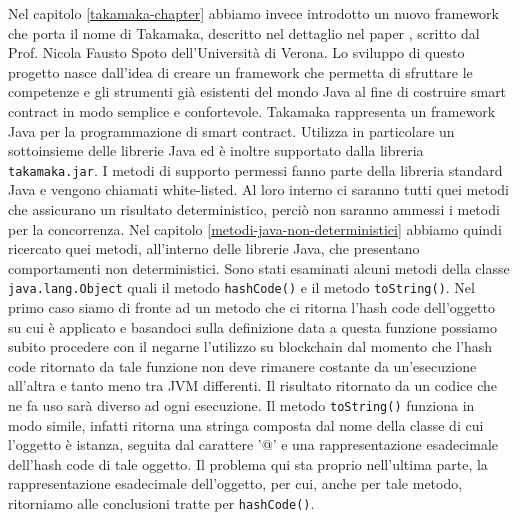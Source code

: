 Nel capitolo \ref{takamaka-chapter} abbiamo invece introdotto un nuovo framework che porta il nome di Takamaka, descritto nel dettaglio nel paper \cite{paper-takamaka:spoto}, scritto dal Prof. Nicola Fausto Spoto dell'Università di Verona. Lo sviluppo di questo progetto nasce dall'idea di creare un framework che permetta di sfruttare le competenze e gli strumenti già esistenti del mondo Java al fine di costruire smart contract in modo semplice e confortevole. Takamaka rappresenta un framework Java per la programmazione di smart contract. Utilizza in particolare un sottoinsieme delle librerie Java ed è inoltre supportato dalla libreria \lstinline|takamaka.jar|. I metodi di supporto permessi fanno parte della libreria standard Java e vengono chiamati white-listed. Al loro interno ci saranno tutti quei metodi che assicurano un risultato deterministico, perciò non saranno ammessi i metodi per la concorrenza. Nel capitolo \ref{metodi-java-non-deterministici} abbiamo quindi ricercato quei metodi, all'interno delle librerie Java, che presentano comportamenti non deterministici. Sono stati esaminati alcuni metodi della classe \lstinline|java.lang.Object| quali il metodo \lstinline|hashCode()| e il metodo \lstinline|toString()|. Nel primo caso siamo di fronte ad un metodo che ci ritorna l'hash code dell'oggetto su cui è applicato e basandoci sulla definizione data a questa funzione possiamo subito procedere con il negarne l'utilizzo su blockchain dal momento che l'hash code ritornato da tale funzione non deve rimanere costante da un'esecuzione all'altra e tanto meno tra JVM differenti. Il risultato ritornato da un codice che ne fa uso sarà diverso ad ogni esecuzione. Il metodo \lstinline|toString()| funziona in modo simile, infatti ritorna una stringa composta dal nome della classe di cui l'oggetto è istanza, seguita dal carattere '@' e una rappresentazione esadecimale dell'hash code di tale oggetto. Il problema qui sta proprio nell'ultima parte, la rappresentazione esadecimale dell'oggetto, per cui, anche per tale metodo, ritorniamo alle conclusioni tratte per \lstinline|hashCode()|.
